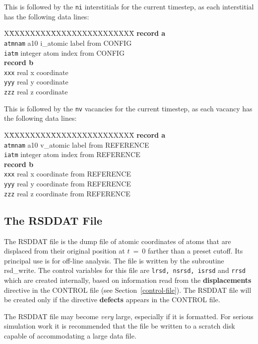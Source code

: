 This is followed by the {\tt ni} interstitials for the current
timestep, as each interstitial has the following data lines:
\begin{tabbing}
X\=XXXXXXXX\=XXXXXXXXXXXXXXXX\=\kill
{\bf record a}  \\
\> {\tt atmnam} \> a10     \> i\_atomic label from CONFIG \\
\> {\tt iatm}   \> integer \> atom index from CONFIG \\
{\bf record b} \\
\> {\tt xxx}    \> real    \> x coordinate \\
\> {\tt yyy}    \> real    \> y coordinate \\
\> {\tt zzz}    \> real    \> z coordinate
\end{tabbing}
This is followed by the {\tt nv} vacancies for the current
timestep, as each vacancy has the following data lines:
\begin{tabbing}
X\=XXXXXXXX\=XXXXXXXXXXXXXXXX\=\kill
{\bf record a}  \\
\> {\tt atmnam} \> a10     \> v\_atomic label from REFERENCE \\
\> {\tt iatm}   \> integer \> atom index from REFERENCE \\
{\bf record b} \\
\> {\tt xxx}    \> real    \> x coordinate from REFERENCE \\
\> {\tt yyy}    \> real    \> y coordinate from REFERENCE \\
\> {\tt zzz}    \> real    \> z coordinate from REFERENCE
\end{tabbing}

\subsection{The RSDDAT File}
\label{rsddat-file}

The RSDDAT file is the dump file of atomic coordinates of atoms
that are displaced from their original position at $t~=~0$ farther
than a preset cutoff.  Its principal use is for off-line analysis.
The file is written by the subroutine {\sc rsd\_write}.  The control
variables for this file are {\tt lrsd, nsrsd, isrsd} and {\tt rrsd}
which are created internally, based on information read from
the {\bf displacements} directive in the CONTROL file (see
Section~\ref{control-file}).  The RSDDAT file will be created only
if the directive {\bf defects} appears in the CONTROL file.

The RSDDAT file may become {\em very} large, especially if it is
formatted.  For serious simulation work it is recommended that the
file be written to a scratch disk capable of accommodating a large
data file.

